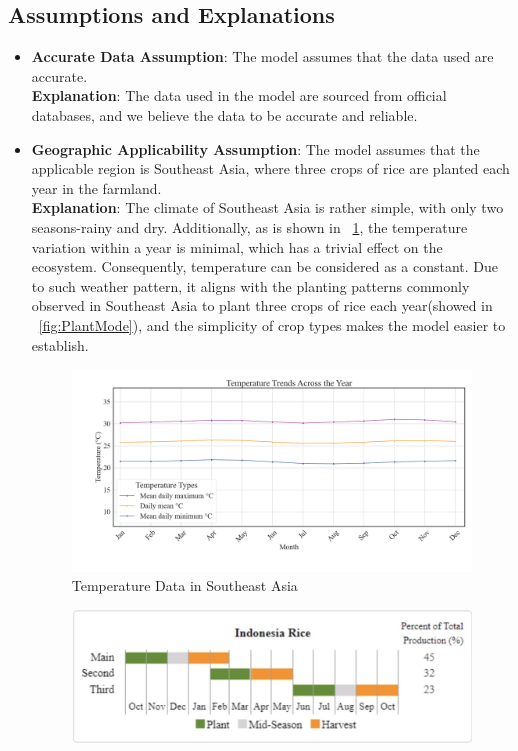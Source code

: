 \documentclass{HZNUMCM}
\begin{document}
    \subsection{Assumptions and Explanations}
      \begin{itemize}
        \item \textbf{Accurate Data Assumption}: The model assumes that the data used are accurate.\\
        \textbf{Explanation}: The data used in the model are sourced from official databases, and we believe the data to be accurate and reliable.
        \item \textbf{Geographic Applicability Assumption}: The model assumes that the applicable region is Southeast Asia,
         where three crops of rice are planted each year in the farmland.\\
        \textbf{Explanation}: The climate of Southeast Asia is rather simple, 
        with only two seasons-rainy and dry. Additionally, as is shown in \figurename~\ref{fig:Temperature},
        the temperature variation within a year is minimal, which has a trivial effect on the ecosystem.
        Consequently, temperature can be considered as a constant.
        Due to such weather pattern, it aligns with the planting patterns commonly observed in Southeast Asia to plant three crops of rice each year(showed in \figurename~\ref{fig:PlantMode}),
         and the simplicity of crop types makes the model easier to establish.
        \begin{figure}[H]
          \centering
          \includegraphics[width=0.75\linewidth]{images/AverTemper.png}
          \caption{Temperature Data in Southeast Asia\cite{IndoTemper}}
          \label{fig:Temperature}
        \end{figure}
        \begin{figure}[H]
          \centering
          \includegraphics[width=0.75\linewidth]{images/PlantMode.jpg}

\end{figure}
\end{itemize}
\end{document}
